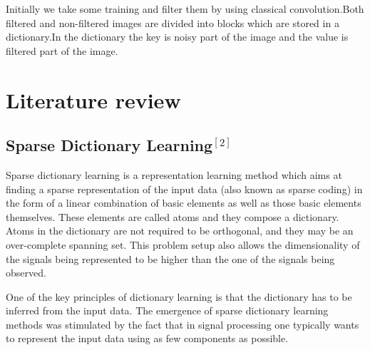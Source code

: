 \documentclass[journal]{IEEEtran}
\begin{document}
	Initially we take some training and filter them by using classical convolution.Both filtered and non-filtered images are divided into blocks which are stored in a dictionary.In the dictionary the key is noisy part of the image and the value is filtered part of the image.
	
	\section{\textbf{Literature review}}
	\subsection{Sparse Dictionary Learning$^{[2]}$}
	Sparse dictionary learning is a representation learning
	method which aims at finding a sparse representation of the
	input data (also known as sparse coding) in the form of a
	linear combination of basic elements as well as those basic
	elements themselves. These elements are called atoms and they
	compose a dictionary. Atoms in the dictionary are not required
	to be orthogonal, and they may be an over-complete spanning
	set. This problem setup also allows the dimensionality of the
	signals being represented to be higher than the one of the
	signals being observed.
	
	One of the key principles of dictionary learning is that the
	dictionary has to be inferred from the input data. The emergence
	of sparse dictionary learning methods was stimulated
	by the fact that in signal processing one typically wants to
	represent the input data using as few components as possible.
	
\end{document}
